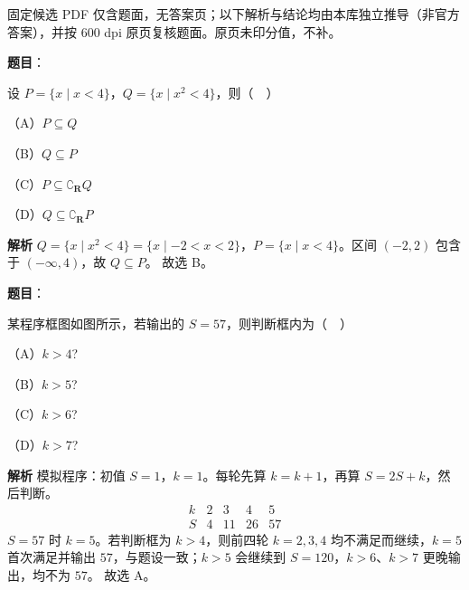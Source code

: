 \begin{gktip}
固定候选 PDF 仅含题面，无答案页；以下解析与结论均由本库独立推导（非官方答案），并按 600 dpi 原页复核题面。原页未印分值，不补。
\end{gktip}

\begin{answer}

\textbf{题目}：

设 $P=\{x\mid x<4\}$，$Q=\{x\mid x^2<4\}$，则（　）

（A）$P\subseteq Q$

（B）$Q\subseteq P$

（C）$P\subseteq\complement_{\mathbf R}Q$

（D）$Q\subseteq\complement_{\mathbf R}P$

\textbf{解析}
$Q=\{x\mid x^2<4\}=\{x\mid -2<x<2\}$，$P=\{x\mid x<4\}$。区间 $(-2,2)$ 包含于 $(-\infty,4)$，故 $Q\subseteq P$。
故选 B。


\end{answer}
\begin{answer}

\textbf{题目}：

某程序框图如图所示，若输出的 $S=57$，则判断框内为（　）

（A）$k>4$?

（B）$k>5$?

（C）$k>6$?

（D）$k>7$?
\nopagebreak[4]
\begin{center}\end{center}
\nopagebreak[4]
\textbf{解析}
模拟程序：初值 $S=1$，$k=1$。每轮先算 $k=k+1$，再算 $S=2S+k$，然后判断。
\nopagebreak[4]
\[\begin{array}{c|cccc}
k & 2 & 3 & 4 & 5\\ \hline
S & 4 & 11 & 26 & 57
\end{array}\]
$S=57$ 时 $k=5$。若判断框为 $k>4$，则前四轮 $k=2,3,4$ 均不满足而继续，$k=5$ 首次满足并输出 $57$，与题设一致；$k>5$ 会继续到 $S=120$，$k>6$、$k>7$ 更晚输出，均不为 $57$。
故选 A。


\end{answer}
